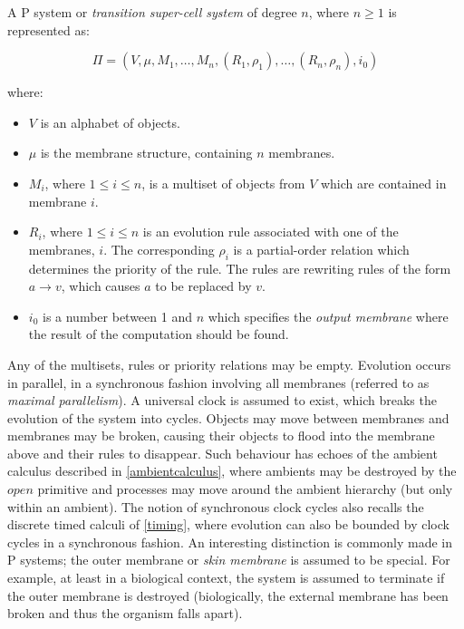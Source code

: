 A P system or \emph{transition super-cell system}
\cite{paun:98membranes} of degree $n$, where $n \ge 1$ is represented
as:

\begin{equation}
\Pi = (V, \mu, M_1, \dots, M_n,(R_1,\rho_1), \dots, (R_n,\rho_n),i_0)
\end{equation}

\noindent where:

\begin{itemize}
\item $V$ is an alphabet of objects.
\item $\mu$ is the membrane structure, containing $n$ membranes.
\item $M_i$, where $1 \le i \le n$, is a multiset of objects from $V$
      which are contained in membrane $i$.
\item $R_i$, where $1 \le i \le n$ is an evolution rule associated with
      one of the membranes, $i$. The corresponding $\rho_i$ is a
      partial-order relation which determines the priority of the rule.
      The rules are rewriting rules of the form $a \rightarrow v$, which
      causes $a$ to be replaced by $v$.
\item $i_0$ is a number between 1 and $n$ which specifies the \emph{output
      membrane} where the result of the computation should be found.
\end{itemize}

\noindent Any of the multisets, rules or priority relations may be
empty.  Evolution occurs in parallel, in a synchronous fashion involving
all membranes (referred to as \emph{maximal parallelism}).  A universal
clock is assumed to exist, which breaks the evolution of the system into
cycles.  Objects may move between membranes and membranes may be broken,
causing their objects to flood into the membrane above and their rules to
disappear.  Such behaviour has echoes of the ambient calculus described
in \ref{ambientcalculus}, where ambients may be destroyed by the $open$
primitive and processes may move around the ambient hierarchy (but only
within an ambient).  The notion of synchronous clock cycles also recalls
the discrete timed calculi of \ref{timing}, where evolution can also be
bounded by clock cycles in a synchronous fashion.  An interesting
distinction is commonly made in P systems; the outer membrane or
\emph{skin membrane} is assumed to be special.  For example, at least in
a biological context, the system is assumed to terminate if the outer
membrane is destroyed (biologically, the external membrane has been
broken and thus the organism falls apart).

